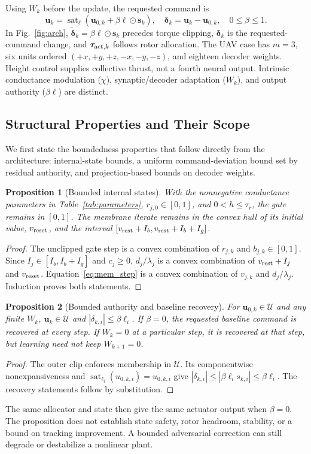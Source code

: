 \documentclass[letterpaper, 10 pt, conference]{ieeeconf}
\newcommand{\sat}{\operatorname{sat}}
\newtheorem{proposition}{Proposition}
\begin{document}
Using $W_k$ before the update, the requested command is
\begin{equation}
 \bm u_k=\sat_{\bm\ell}(\bm u_{0,k}+\beta\bm\ell\odot\bm s_k),\quad
 \bm\delta_k=\bm u_k-\bm u_{0,k},\quad 0\le\beta\le1.
 \label{eq:residual}
\end{equation}
In Fig.~\ref{fig:arch}, $\widetilde{\bm\delta}_k=\beta\bm\ell\odot\bm s_k$
precedes torque clipping, $\bm\delta_k$ is the requested-command change,
and $\bm\tau_{{\rm act},k}$ follows rotor allocation.
The UAV case has $m=3$, six units ordered $(+x,+y,+z,-x,-y,-z)$, and
eighteen decoder weights. Height control supplies collective thrust,
not a fourth neural output. Intrinsic conductance modulation ($\chi$), synaptic/decoder
adaptation ($W_k$), and output authority ($\beta\bm\ell$) are distinct.

\subsection{Structural Properties and Their Scope}
We first state the boundedness properties that follow directly from the architecture: internal-state bounds, a uniform command-deviation bound set by residual authority, and projection-based bounds on decoder weights.
\begin{proposition}[Bounded internal states]
With the nonnegative conductance parameters in Table~\ref{tab:parameters},
$r_{j,0}\in[0,1]$, and $0<h\le\tau_r$, the gate remains in $[0,1]$.
The membrane iterate remains in the convex hull of its initial value,
$v_{\rm reset}$, and the interval
$[v_{\rm rest}+I_b,v_{\rm rest}+I_b+I_g]$.
\end{proposition}
\begin{proof}
The unclipped gate step is a convex combination of $r_{j,k}$ and
$b_{j,k}\in[0,1]$. Since $I_j\in[I_b,I_b+I_g]$ and $c_j\ge0$,
$d_j/\lambda_j$ is a convex combination of $v_{\rm rest}+I_j$ and
$v_{\rm reset}$. Equation~\eqref{eq:mem_step} is a convex combination of
$v_{j,k}$ and $d_j/\lambda_j$. Induction proves both statements.
\end{proof}

\begin{proposition}[Bounded authority and baseline recovery]
\label{prop:authority}
For $\bm u_{0,k}\in\mathcal U$ and any finite $W_k$,
$\bm u_k\in\mathcal U$ and $|\delta_{k,i}|\le\beta\ell_i$.
If $\beta=0$, the requested baseline command is recovered at every step.
If $W_k=0$ at a particular step, it is recovered at that step, but learning
need not keep $W_{k+1}=0$.
\end{proposition}
\begin{proof}
The outer clip enforces membership in $\mathcal U$. Its componentwise
nonexpansiveness and $\sat_{\ell_i}(u_{0,k,i})=u_{0,k,i}$ give
$|\delta_{k,i}|\le|\beta\ell_i s_{k,i}|\le\beta\ell_i$.
The recovery statements follow by substitution.
\end{proof}
The same allocator and state then give the same actuator output when
$\beta=0$. The proposition does not establish state safety, rotor
headroom, stability, or a bound on tracking improvement. A bounded
adversarial correction can still degrade or destabilize a nonlinear plant.
\end{document}
